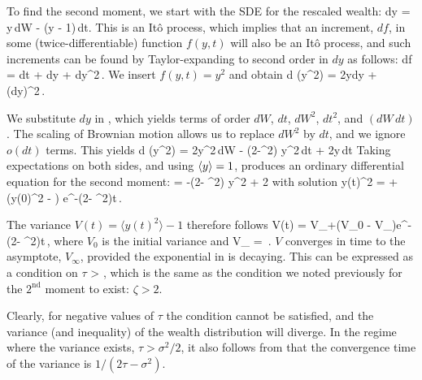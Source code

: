 To find the second moment, we start with the SDE for the rescaled wealth:
\be
dy = \sigma y\,dW - \tau\left(y - 1\right)\,dt.
\ee
This is an It\^o process, which implies that an increment, $df$, in some (twice-differentiable) function $f\left(y,t\right)$ will also be an It\^o process, and such increments can be found by Taylor-expanding to second order in $dy$ as follows:
\be
df =  dt +  dy +  dy^2\,.
\ee
We insert $f\left(y,t\right)=y^2$ and obtain
\be
d \left(y^2\right) = 2ydy + \left(dy\right)^2\,.
\ee

We substitute $dy$ in , which yields terms of order $dW$, $dt$, $dW^2$, $dt^2$, and $\left(dW\,dt\right)$. The scaling of Brownian motion allows us to replace $dW^2$ by $dt$, and we ignore $o\left(dt\right)$ terms. This yields
\bea
d \left(y^2\right) = 2\sigma y^2\,dW - \left(2\tau-\sigma^2\right) y^2\,dt + 2\tau y\,dt %
\eea
Taking expectations on both sides, and using $\left\langle y \right\rangle=1$, produces an ordinary differential equation for the second moment:
\be
{} = -\left(2\tau - \sigma^2\right) \langle y^2 \rangle + 2\tau
{}
\ee
with solution
\be
\langle y\left(t\right)^2 \rangle =  + \left(\langle y\left(0\right)^2 \rangle - \right) e^{-\left(2\tau - \sigma^2\right)t}\,.
\ee

The variance $V\left(t\right)=\langle y\left(t\right)^2 \rangle-1$ therefore follows
\be
V\left(t\right) = V_{\infty}+\left(V_0 - V_{\infty}\right)e^{-\left(2\tau - \sigma^2\right)t}\,,
\ee
where $V_0$ is the initial variance and
\be
V_{\infty} = \,.
\ee
$V$ converges in time to the asymptote, $V_{\infty}$, provided the exponential in  is decaying. 
This can be expressed as a condition on $\tau$
\be
\tau > ,
\ee
which is the same as the condition we noted previously for the $2^\text{nd}$ moment to exist: $\zeta>2$.

Clearly, for negative values of $\tau$ the condition cannot be satisfied, and the variance (and inequality) of the wealth distribution will diverge. In the regime where the variance exists, $\tau > \sigma^2/2$, it also follows from  that the convergence time of the variance is $1/\left(2\tau - \sigma^2\right)$.

